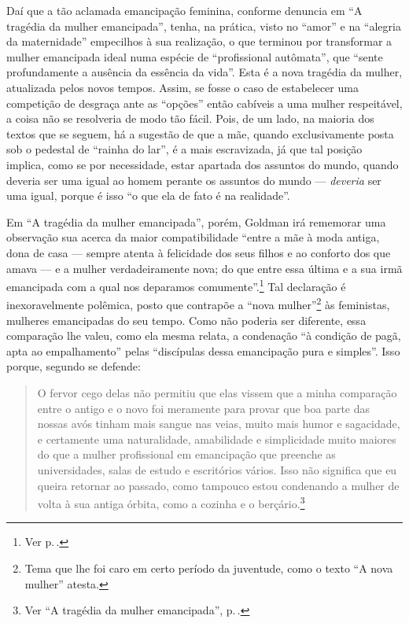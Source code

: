 Daí que a tão aclamada emancipação
feminina, conforme denuncia em ``A tragédia da mulher emancipada'',
tenha, na prática, visto no ``amor'' e na ``alegria da maternidade''
empecilhos à sua realização, o que terminou por transformar a mulher
emancipada ideal numa espécie de ``profissional autômata'', que ``sente
profundamente a ausência da essência da vida''. Esta é a nova tragédia
da mulher, atualizada pelos novos tempos. Assim, se fosse o caso de
estabelecer uma competição de desgraça ante as ``opções'' então cabíveis
a uma mulher respeitável, a coisa não se resolveria de modo tão fácil.
Pois, de um lado, na maioria dos textos que se seguem, há a sugestão de
que a mãe, quando exclusivamente posta sob o pedestal de ``rainha do
lar'', é a mais escravizada, já que tal posição implica, como se por
necessidade, estar apartada dos assuntos do mundo, quando deveria ser
uma igual ao homem perante os assuntos do mundo --- \emph{deveria} ser
uma igual, porque é isso ``o que ela de fato é na realidade''.

Em ``A
tragédia da mulher emancipada'', porém, Goldman irá rememorar uma
observação sua acerca da maior compatibilidade ``entre a mãe à moda antiga, dona de casa ---
sempre atenta à felicidade dos seus filhos e ao conforto dos que
amava --- e a mulher verdadeiramente nova; do que entre essa última e a sua
irmã emancipada com a qual nos deparamos comumente''.\footnote{Ver p.\,\pageref{mae}.} Tal declaração é inexoravelmente polêmica, posto que
contrapõe a ``nova mulher''\footnote{Tema que lhe foi caro em certo período da
juventude, como o texto ``A nova mulher'' atesta.} às
feministas, mulheres emancipadas do seu tempo. Como não poderia ser
diferente, essa comparação lhe valeu, como ela mesma relata, a condenação
``à condição de pagã,
apta ao empalhamento'' pelas ``discípulas dessa emancipação pura e
simples''. Isso porque, segundo se defende:

\begin{quote}
O fervor cego delas não permitiu que elas vissem que a
minha comparação entre o antigo e o novo foi meramente para provar que
boa parte das nossas avós tinham mais sangue nas veias, muito mais humor
e sagacidade, e certamente uma naturalidade, amabilidade e simplicidade
muito maiores do que a mulher profissional em emancipação que preenche
as universidades, salas de estudo e escritórios vários. Isso não
significa que eu queira retornar ao passado, como tampouco estou condenando a mulher de volta à sua antiga órbita, como a cozinha e o berçário.\footnote{Ver ``A tragédia da mulher emancipada'', p.\,\pageref{mae}.}
\end{quote}


